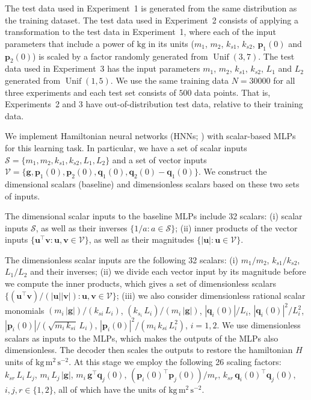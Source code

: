 \documentclass[twoside,11pt]{article}
\DeclareMathOperator{\Unif}{Unif}
\newcommand{\unit}[1]{\mathrm{#1}}
\newcommand{\kg}{\unit{kg}}
\newcommand{\m}{\unit{m}}
\newcommand{\s}{\unit{s}}
\begin{document}
The test data used in Experiment~1 is generated from the same distribution as the training dataset. The test data used in Experiment~2 consists of applying a transformation to the test data in Experiment~1, where each of the input parameters that include a power of $\kg$ in its units ($m_1$, $m_2$, $k_{s1}$, $k_{s2}$, $\mathbf{p}_1(0)$ and $\mathbf{p}_2(0)$) is scaled by a factor randomly generated from $\Unif(3,7)$. The test data used in Experiment~3 has the input parameters $m_1$, $m_2$, $k_{s1}$, $k_{s2}$, $L_1$ and $L_2$ generated from $\Unif(1,5)$. 
We use the same training data $N=30000$ for all three experiments and each test set consists of $500$ data points. That is, Experiments~2 and 3 have out-of-distribution test data, relative to their training data.

We implement Hamiltonian neural networks (HNNs; \citealt{greydanus2019hnn,sanchezgonzalez2019hamiltonian}) with scalar-based MLPs for this learning task. In particular, we have a set of scalar inputs $\mathcal{S}=\{m_1,m_2,k_{s1},k_{s2},L_1,L_2\}$ and a set of vector inputs $\mathcal{V} = \{\mathbf{g}, \mathbf{p}_1(0),\mathbf{p}_2(0),\mathbf{q}_1(0) ,\mathbf{q}_2(0)-\mathbf{q}_1(0)\}$. We construct the dimensional scalars (baseline) and dimensionless scalars based on these two sets of inputs. 

The dimensional scalar inputs to the baseline MLPs include 32 scalars: 
(i) scalar inputs $\mathcal{S}$, as well as their inverses $\{1/a:a\in\mathcal{S}\}$;
(ii) inner products of the vector inputs $\{\mathbf{u}^\top\mathbf{v}:\mathbf{u},\mathbf{v}\in\mathcal{V}\}$, as well as their magnitudes $\{|\mathbf{u}|:\mathbf{u}\in\mathcal{V}\}$.  

The dimensionless scalar inputs are the following 32 scalars: (i) $m_1/m_2$, $k_{s1}/k_{s2}$, $L_1/L_2$ and their inverses;
(ii) we divide each vector input by its magnitude before we compute the inner products, which gives a set of dimensionless scalars $\{(\mathbf{u}^\top \mathbf{v})/(|\mathbf{u}||\mathbf{v}|):\mathbf{u},\mathbf{v}\in\mathcal{V}\}$;
(iii) we also consider dimensionless rational scalar monomials $(m_i\,|\mathbf{g}|)/(k_{si}\,L_i)$, $(k_{s_i}\,L_i)/(m_i\,|\mathbf{g}|)$, $|\mathbf{q}_i(0)|/L_i$, $|\mathbf{q}_i(0)|^2/L_i^2$, $|\mathbf{p}_i(0)| /( \sqrt{m_i\,k_{si}}\,L_i)$, $|\mathbf{p}_i(0)|^2 /(m_i\,k_{si}\,L_i^2)$, $i=1,2$. 
We use dimensionless scalars as inputs to the MLPs, which makes the outputs of the MLPs also dimensionless. 
The decoder then scales the outputs to restore the hamiltonian $H$ units of $\kg\,\m^2\,\s^{-2}$. At this stage we employ the following 26 scaling factors: $k_{sr}\,L_i\,L_j$, $m_i\,L_j\,|\mathbf{g}|$, $m_i\,\mathbf{g}^\top \mathbf{q}_j(0)$, $(\mathbf{p}_i(0)^\top \mathbf{p}_j(0))/m_r$, $k_{sr}\,\mathbf{q}_i(0)^\top \mathbf{q}_j(0)$, $i,j,r\in\{1,2\}$, all of which have the units of $\kg\,\m^2\,\s^{-2}$. 
\end{document}
